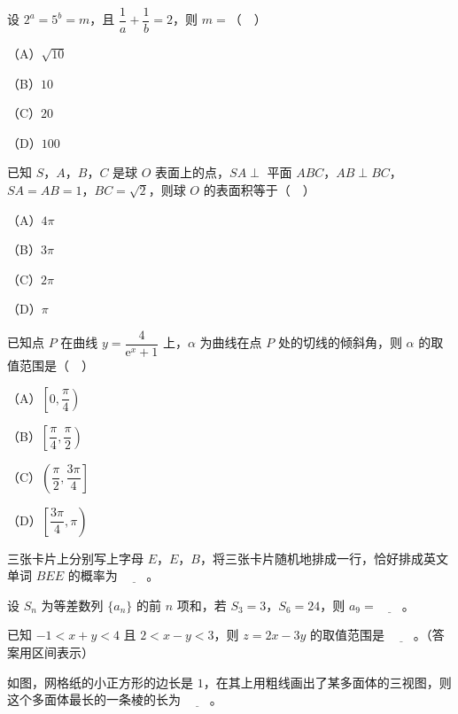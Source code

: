 \begin{question}
设 $2^a=5^b=m$，且 $\dfrac1a+\dfrac1b=2$，则 $m=$（　）

（A）$\sqrt{10}$

（B）$10$

（C）$20$

（D）$100$

\end{question}
\begin{question}
已知 $S$，$A$，$B$，$C$ 是球 $O$ 表面上的点，$SA\perp$ 平面 $ABC$，$AB\perp BC$，$SA=AB=1$，$BC=\sqrt2$，则球 $O$ 的表面积等于（　）

（A）$4\pi$

（B）$3\pi$

（C）$2\pi$

（D）$\pi$

\end{question}
\begin{question}
已知点 $P$ 在曲线 $y=\dfrac{4}{\mathrm e^x+1}$ 上，$\alpha$ 为曲线在点 $P$ 处的切线的倾斜角，则 $\alpha$ 的取值范围是（　）

（A）$\left[0,\dfrac{\pi}{4}\right)$

（B）$\left[\dfrac{\pi}{4},\dfrac{\pi}{2}\right)$

（C）$\left(\dfrac{\pi}{2},\dfrac{3\pi}{4}\right]$

（D）$\left[\dfrac{3\pi}{4},\pi\right)$

\end{question}
\begin{question}
三张卡片上分别写上字母 $E$，$E$，$B$，将三张卡片随机地排成一行，恰好排成英文单词 $BEE$ 的概率为 $\underline{\qquad}$。

\end{question}
\begin{question}
设 $S_n$ 为等差数列 $\{a_n\}$ 的前 $n$ 项和，若 $S_3=3$，$S_6=24$，则 $a_9=\underline{\qquad}$。

\end{question}
\begin{question}
已知 $-1<x+y<4$ 且 $2<x-y<3$，则 $z=2x-3y$ 的取值范围是 $\underline{\qquad}$。（答案用区间表示）

\Needspace{0.4\textheight}
\end{question}
\begingroup
\renewenvironment{question}{\Needspace{0.5\textheight}}{}
\begin{question}
如图，网格纸的小正方形的边长是 $1$，在其上用粗线画出了某多面体的三视图，则这个多面体最长的一条棱的长为 $\underline{\qquad}$。
\nopagebreak[4]
\begin{center}\end{center}
\nopagebreak[4]
\end{question}
